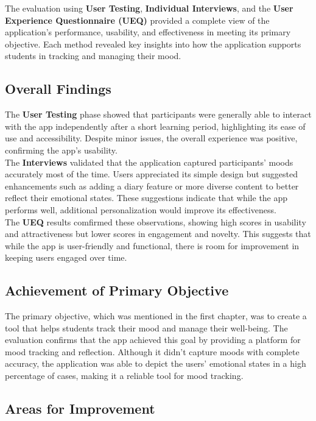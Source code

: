The evaluation using \textbf{User Testing}, \textbf{Individual Interviews}, and the \textbf{User Experience Questionnaire (UEQ)} provided a complete view of the application's performance, usability, and effectiveness in meeting its primary objective. Each method revealed key insights into how the application supports students in tracking and managing their mood.

\subsection{Overall Findings}

The \textbf{User Testing} phase showed that participants were generally able to interact with the app independently after a short learning period, highlighting its ease of use and accessibility. Despite minor issues, the overall experience was positive, confirming the app's usability.\vspace{5mm} \\
The \textbf{Interviews} validated that the application captured participants’ moods accurately most of the time. Users appreciated its simple design but suggested enhancements such as adding a diary feature or more diverse content to better reflect their emotional states. These suggestions indicate that while the app performs well, additional personalization would improve its effectiveness.\vspace{5mm} \\
The \textbf{UEQ} results comfirmed these observations, showing high scores in usability and attractiveness but lower scores in engagement and novelty. This suggests that while the app is user-friendly and functional, there is room for improvement in keeping users engaged over time.

\subsection{Achievement of Primary Objective}

The primary objective, which was mentioned in the first chapter, was to create a tool that helps students track their mood and manage their well-being. The evaluation confirms that the app achieved this goal by providing a platform for mood tracking and reflection. Although it didn’t capture moods with complete accuracy, the application was able to depict the users' emotional states in a high percentage of cases, making it a reliable tool for mood tracking.

\subsection{Areas for Improvement}

